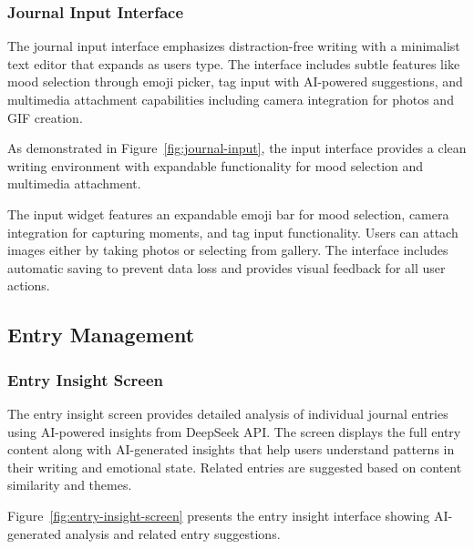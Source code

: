 \subsubsection{Journal Input Interface}

The journal input interface emphasizes distraction-free writing with a minimalist text editor that expands as users type. The interface includes subtle features like mood selection through emoji picker, tag input with AI-powered suggestions, and multimedia attachment capabilities including camera integration for photos and GIF creation.

As demonstrated in Figure~\ref{fig:journal-input}, the input interface provides a clean writing environment with expandable functionality for mood selection and multimedia attachment.


The input widget features an expandable emoji bar for mood selection, camera integration for capturing moments, and tag input functionality. Users can attach images either by taking photos or selecting from gallery. The interface includes automatic saving to prevent data loss and provides visual feedback for all user actions.

\subsection{Entry Management}

\subsubsection{Entry Insight Screen}

The entry insight screen provides detailed analysis of individual journal entries using AI-powered insights from DeepSeek API. The screen displays the full entry content along with AI-generated insights that help users understand patterns in their writing and emotional state. Related entries are suggested based on content similarity and themes.

Figure~\ref{fig:entry-insight-screen} presents the entry insight interface showing AI-generated analysis and related entry suggestions.


